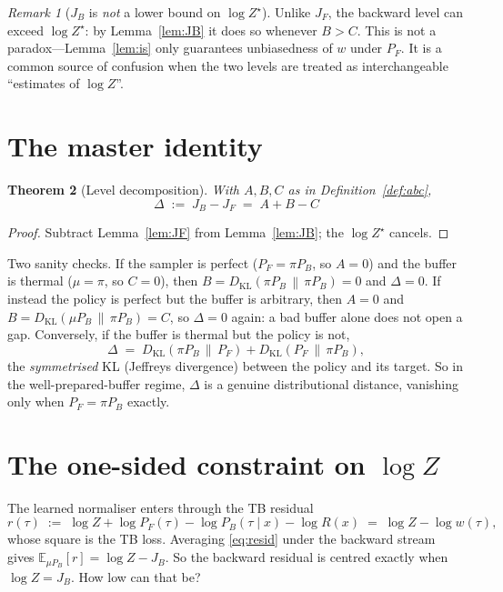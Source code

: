 \documentclass[11pt]{article}
\theoremstyle{plain}
\newtheorem{theorem}{Theorem}
\theoremstyle{definition}
\theoremstyle{remark}
\newtheorem{remark}[theorem]{Remark}
\newcommand{\KL}[2]{D_{\mathrm{KL}}\!\left(#1 \,\middle\|\, #2\right)}
\newcommand{\E}[2]{\mathbb{E}_{#1}\!\left[#2\right]}
\newcommand{\PF}{P_{F}}
\newcommand{\PB}{P_{B}}
\newcommand{\Zstar}{Z^{\star}}
\newcommand{\JF}{J_{F}}
\newcommand{\JB}{J_{B}}
\begin{document}
\begin{remark}[$\JB$ is \emph{not} a lower bound on $\log\Zstar$]
Unlike $\JF$, the backward level can exceed $\log\Zstar$: by Lemma~\ref{lem:JB}
it does so whenever $B > C$. This is not a paradox---Lemma~\ref{lem:is} only
guarantees unbiasedness of $w$ under $\PF$. It is a common source of confusion
when the two levels are treated as interchangeable ``estimates of $\log Z$''.
\end{remark}

\section{The master identity}

\begin{theorem}[Level decomposition]\label{thm:master}
With $A,B,C$ as in Definition~\ref{def:abc},
\[
  \boxed{\;\Delta \;:=\; \JB - \JF \;=\; A + B - C\;}
\]
\end{theorem}
\begin{proof}
Subtract Lemma~\ref{lem:JF} from Lemma~\ref{lem:JB}; the $\log\Zstar$ cancels.
\end{proof}

Two sanity checks. If the sampler is perfect ($\PF = \pi\PB$, so $A = 0$) and the
buffer is thermal ($\mu = \pi$, so $C = 0$), then $B = \KL{\pi\PB}{\pi\PB} = 0$ and
$\Delta = 0$. If instead the policy is perfect but the buffer is arbitrary, then
$A=0$ and $B = \KL{\mu\PB}{\pi\PB} = C$, so $\Delta = 0$ again: a bad buffer alone
does not open a gap. Conversely, if the buffer is thermal but the policy is not,
\[
  \Delta \;=\; \KL{\pi\PB}{\PF} + \KL{\PF}{\pi\PB},
\]
the \emph{symmetrised} KL (Jeffreys divergence) between the policy and its
target. So in the well-prepared-buffer regime, $\Delta$ is a genuine
distributional distance, vanishing only when $\PF = \pi\PB$ exactly.

\section{The one-sided constraint on \texorpdfstring{$\log Z$}{log Z}}

The learned normaliser enters through the TB residual
\begin{equation}\label{eq:resid}
  r(\tau) \;:=\; \log Z + \log\PF(\tau) - \log\PB(\tau\mid x) - \log R(x)
  \;=\; \log Z - \log w(\tau),
\end{equation}
whose square is the TB loss. Averaging \eqref{eq:resid} under the backward stream
gives $\E{\mu\PB}{r} = \log Z - \JB$. So the backward residual is centred exactly
when $\log Z = \JB$. How low can that be?
\end{document}
